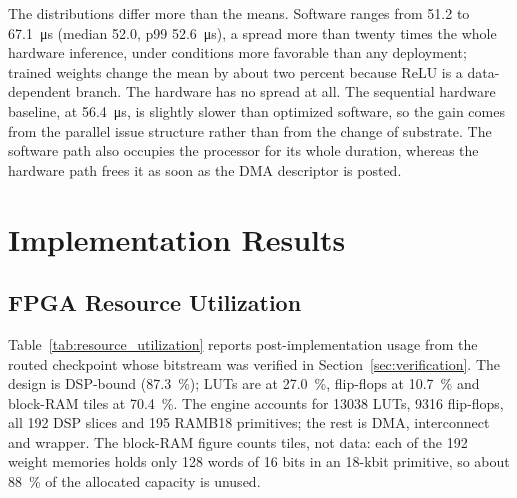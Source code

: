 \documentclass[pdflatex,sn-mathphys-num,iicol]{sn-jnl}
\begin{document}
The distributions differ more than the means. Software ranges from
\SI{51.2}{} to \SI{67.1}{\micro\second} (median \SI{52.0}{}, p99
\SI{52.6}{\micro\second}), a spread more than twenty times the whole hardware
inference, under conditions more favorable than any deployment; trained weights
change the mean by about two percent because ReLU is a data-dependent branch.
The hardware has no spread at all. The sequential hardware baseline, at
\SI{56.4}{\micro\second}, is slightly slower than optimized software, so the
gain comes from the parallel issue structure rather than from the change of
substrate. The software path also occupies the processor for its whole duration,
whereas the hardware path frees it as soon as the DMA descriptor is posted.

\section{Implementation Results}
\label{sec:implresults}
\subsection{FPGA Resource Utilization}
\label{sec:resources}
Table~\ref{tab:resource_utilization} reports post-implementation usage from the
routed checkpoint whose bitstream was verified in
Section~\ref{sec:verification}. The design is DSP-bound (\SI{87.3}{\percent});
LUTs are at \SI{27.0}{\percent}, flip-flops at \SI{10.7}{\percent} and block-RAM
tiles at \SI{70.4}{\percent}. The engine accounts for \num{13038} LUTs,
\num{9316} flip-flops, all 192 DSP slices and 195 RAMB18 primitives; the rest is
DMA, interconnect and wrapper. The block-RAM figure counts tiles, not data: each
of the 192 weight memories holds only 128 words of 16 bits in an 18-kbit
primitive, so about \SI{88}{\percent} of the allocated capacity is unused.
\end{document}
